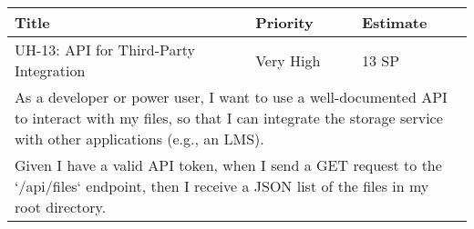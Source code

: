 \vspace{5mm}
\begin{tabular}{|p{4cm}|p{5cm}|p{5cm}|}
    \hline
    \textbf{Title} & \textbf{Priority} & \textbf{Estimate} \\
    \hline
    UH-13: API for Third-Party Integration & Very High & 13 SP \\
    \hline
    \multicolumn{3}{|p{14cm}|}{As a developer or power user, I want to use a well-documented API to interact with my files, so that I can integrate the storage service with other applications (e.g., an LMS).} \\
    \hline
    \multicolumn{3}{|p{14cm}|}{Given I have a valid API token, when I send a GET request to the `/api/files` endpoint, then I receive a JSON list of the files in my root directory.} \\
    \hline
\end{tabular}
